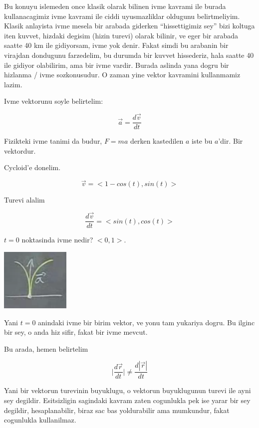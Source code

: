 \documentclass[12pt,fleqn]{article}
\begin{document}
Bu konuyu islemeden once klasik olarak bilinen ivme kavrami ile burada
kullanacagimiz ivme kavrami ile ciddi uyusmazliklar oldugunu
belirtmeliyim. Klasik anlayista ivme mesela bir arabada giderken
``hissettigimiz sey'' bizi koltuga iten kuvvet, hizdaki degisim (hizin
turevi) olarak bilinir, ve eger bir arabada saatte 40 km ile gidiyorsam,
ivme yok denir. Fakat simdi bu arabanin bir virajdan dondugunu farzedelim,
bu durumda bir kuvvet hissederiz, hala saatte 40 ile gidiyor olabilirim,
ama bir ivme vardir. Burada aslinda yana dogru bir hizlanma / ivme
sozkonusudur. O zaman yine vektor kavramini kullanmamiz lazim. 

Ivme vektorunu soyle belirtelim:

\[ \vec{a} = \frac{d\vec{v}}{dt} \]

Fizikteki ivme tanimi da budur, $F = ma$ derken kastedilen $a$ iste bu
$a$'dir. Bir vektordur. 

Cycloid'e donelim. 

\[ \vec{v} = <1-cos(t),sin(t)>\]

Turevi alalim

\[ \frac{d\vec{v}}{dt} = <sin(t), cos(t)>\]

$t=0$ noktasinda ivme nedir? $<0,1>$. 

\includegraphics[height=3cm]{6_2.png}

Yani $t=0$ anindaki ivme bir birim vektor, ve yonu tam yukariya dogru. Bu
ilginc bir sey, o anda hiz sifir, fakat bir ivme mevcut. 

Bu arada, hemen belirtelim

\[ \bigg|\frac{d\vec{r}}{dt}\bigg|  \ne \frac{d|\vec{r}|}{dt}\]


Yani bir vektorun turevinin buyuklugu, o vektorun buyuklugunun turevi ile
ayni sey degildir. Esitsizligin sagindaki kavram zaten cogunlukla pek ise
yarar bir sey degildir, hesaplanabilir, biraz sac bas yoldurabilir ama
mumkundur, fakat cogunlukla kullanilmaz. 
\end{document}
